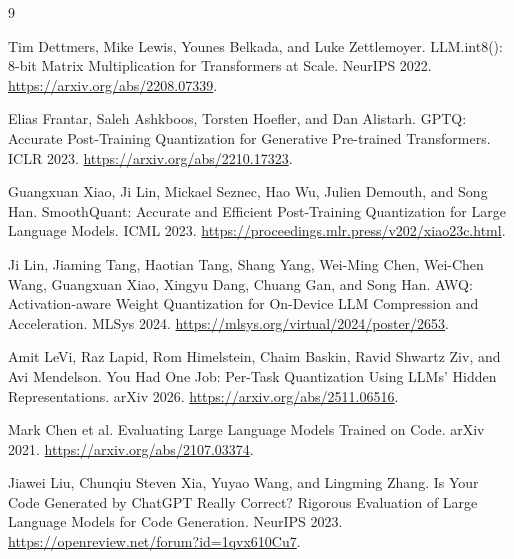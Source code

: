 \documentclass{article}
\begin{document}
\begin{thebibliography}{9}

Tim Dettmers, Mike Lewis, Younes Belkada, and Luke Zettlemoyer.
\newblock LLM.int8(): 8-bit Matrix Multiplication for Transformers at Scale.
\newblock NeurIPS 2022. \url{https://arxiv.org/abs/2208.07339}.

Elias Frantar, Saleh Ashkboos, Torsten Hoefler, and Dan Alistarh.
\newblock GPTQ: Accurate Post-Training Quantization for Generative Pre-trained Transformers.
\newblock ICLR 2023. \url{https://arxiv.org/abs/2210.17323}.

Guangxuan Xiao, Ji Lin, Mickael Seznec, Hao Wu, Julien Demouth, and Song Han.
\newblock SmoothQuant: Accurate and Efficient Post-Training Quantization for Large Language Models.
\newblock ICML 2023. \url{https://proceedings.mlr.press/v202/xiao23c.html}.

Ji Lin, Jiaming Tang, Haotian Tang, Shang Yang, Wei-Ming Chen, Wei-Chen Wang, Guangxuan Xiao, Xingyu Dang, Chuang Gan, and Song Han.
\newblock AWQ: Activation-aware Weight Quantization for On-Device LLM Compression and Acceleration.
\newblock MLSys 2024. \url{https://mlsys.org/virtual/2024/poster/2653}.

Amit LeVi, Raz Lapid, Rom Himelstein, Chaim Baskin, Ravid Shwartz Ziv, and Avi Mendelson.
\newblock You Had One Job: Per-Task Quantization Using LLMs' Hidden Representations.
\newblock arXiv 2026. \url{https://arxiv.org/abs/2511.06516}.

Mark Chen et al.
\newblock Evaluating Large Language Models Trained on Code.
\newblock arXiv 2021. \url{https://arxiv.org/abs/2107.03374}.

Jiawei Liu, Chunqiu Steven Xia, Yuyao Wang, and Lingming Zhang.
\newblock Is Your Code Generated by ChatGPT Really Correct? Rigorous Evaluation of Large Language Models for Code Generation.
\newblock NeurIPS 2023. \url{https://openreview.net/forum?id=1qvx610Cu7}.


\end{thebibliography}
\end{document}
